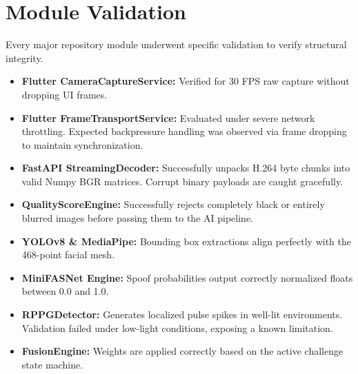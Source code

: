 \section{Module Validation}
Every major repository module underwent specific validation to verify structural integrity.
\begin{itemize}
    \item \textbf{Flutter CameraCaptureService:} Verified for 30 FPS raw capture without dropping UI frames.
    \item \textbf{Flutter FrameTransportService:} Evaluated under severe network throttling. Expected backpressure handling was observed via frame dropping to maintain synchronization.
    \item \textbf{FastAPI StreamingDecoder:} Successfully unpacks H.264 byte chunks into valid Numpy BGR matrices. Corrupt binary payloads are caught gracefully.
    \item \textbf{QualityScoreEngine:} Successfully rejects completely black or entirely blurred images before passing them to the AI pipeline.
    \item \textbf{YOLOv8 \& MediaPipe:} Bounding box extractions align perfectly with the 468-point facial mesh. 
    \item \textbf{MiniFASNet Engine:} Spoof probabilities output correctly normalized floats between 0.0 and 1.0.
    \item \textbf{RPPGDetector:} Generates localized pulse spikes in well-lit environments. Validation failed under low-light conditions, exposing a known limitation.
    \item \textbf{FusionEngine:} Weights are applied correctly based on the active challenge state machine.
\end{itemize}

